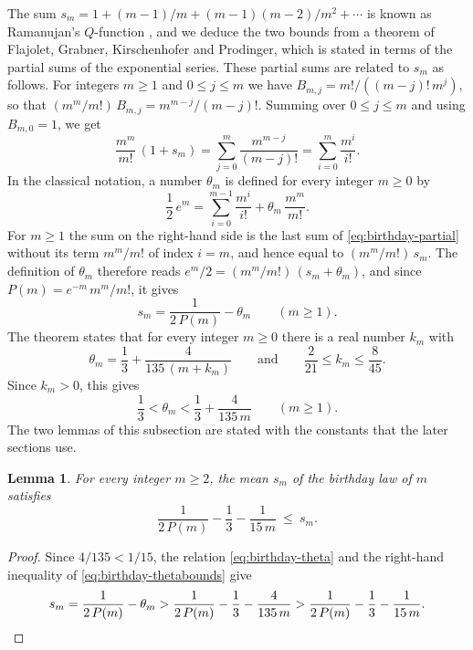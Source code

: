 \documentclass{amsart}
\newtheorem{lemma}[theorem]{Lemma}
\theoremstyle{definition}
\theoremstyle{remark}
\numberwithin{equation}{section}
\begin{document}
The sum $s_m=1+(m-1)/m+(m-1)(m-2)/m^{2}+\cdots$ is known as Ramanujan's
$Q$-function \cite[(1.3)]{flajolet1995}, and we deduce the two bounds from
a theorem of Flajolet, Grabner, Kirschenhofer and Prodinger, which is stated
in terms of the partial sums of the exponential series. These partial sums
are related to $s_m$ as follows. For integers $m\ge1$ and $0\le j\le m$ we
have $B_{m,j}=m!/((m-j)!\,m^{j})$, so
that $(m^{m}/m!)\,B_{m,j}=m^{m-j}/(m-j)!$. Summing over $0\le j\le m$ and
using $B_{m,0}=1$, we get
\begin{equation}\label{eq:birthday-partial}
\frac{m^{m}}{m!}\,(1+s_m)=\sum_{j=0}^{m}\frac{m^{m-j}}{(m-j)!}
=\sum_{i=0}^{m}\frac{m^{i}}{i!}.
\end{equation}
In the classical notation, a number $\theta_m$ is
defined for every integer $m\ge0$ by
\[
\frac12\,e^{m}=\sum_{i=0}^{m-1}\frac{m^{i}}{i!}+\theta_m\,\frac{m^{m}}{m!}.
\]
For $m\ge1$ the sum on the right-hand side is the last sum of
\eqref{eq:birthday-partial} without its term $m^{m}/m!$ of index $i=m$, and
hence equal to $(m^{m}/m!)\,s_m$. The definition of $\theta_m$ therefore
reads $e^{m}/2=(m^{m}/m!)\,(s_m+\theta_m)$, and since
$P(m)=e^{-m}\,m^{m}/m!$, it gives
\begin{equation}\label{eq:birthday-theta}
s_m=\frac{1}{2\,P(m)}-\theta_m\qquad(m\ge1).
\end{equation}
The theorem \cite[Theorem~7]{flajolet1995} states that for every integer
$m\ge0$ there is a real number $k_m$ with
\[
\theta_m=\frac13+\frac{4}{135\,(m+k_m)}\qquad\text{and}\qquad
\frac{2}{21}\le k_m\le\frac{8}{45}.
\]
Since $k_m>0$, this gives
\begin{equation}\label{eq:birthday-thetabounds}
\frac13<\theta_m<\frac13+\frac{4}{135\,m}\qquad(m\ge1).
\end{equation}
The two lemmas of this subsection are stated with the constants that the
later sections use.

\begin{lemma}\label{lem:birthdaylower}
For every integer $m\ge2$, the mean $s_m$ of the birthday law of $m$
satisfies
\[
\frac{1}{2\,P(m)}-\frac13-\frac{1}{15\,m}\ \le\ s_m.
\]
\end{lemma}

\begin{proof}
Since $4/135<1/15$, the relation \eqref{eq:birthday-theta} and the
right-hand inequality of \eqref{eq:birthday-thetabounds} give
\[
s_m=\frac{1}{2\,P(m)}-\theta_m
>\frac{1}{2\,P(m)}-\frac13-\frac{4}{135\,m}
>\frac{1}{2\,P(m)}-\frac13-\frac{1}{15\,m}.\qedhere
\]
\end{proof}
\end{document}
